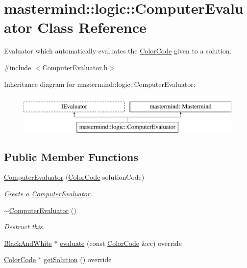 \hypertarget{classmastermind_1_1logic_1_1_computer_evaluator}{}\section{mastermind\+:\+:logic\+:\+:Computer\+Evaluator Class Reference}
\label{classmastermind_1_1logic_1_1_computer_evaluator}


Evaluator which automatically evaluates the \hyperlink{classmastermind_1_1logic_1_1_color_code}{Color\+Code} given to a solution.  




{\ttfamily \#include $<$Computer\+Evaluator.\+h$>$}

Inheritance diagram for mastermind\+:\+:logic\+:\+:Computer\+Evaluator\+:\begin{figure}[H]
\begin{center}
\leavevmode
\includegraphics[height=2.000000cm]{classmastermind_1_1logic_1_1_computer_evaluator}
\end{center}
\end{figure}
\subsection*{Public Member Functions}
\begin{DoxyCompactItemize}
\item 
\hyperlink{classmastermind_1_1logic_1_1_computer_evaluator_a63c369068472dc8117552f991bd37a7a}{Computer\+Evaluator} (\hyperlink{classmastermind_1_1logic_1_1_color_code}{Color\+Code} solution\+Code)
\begin{DoxyCompactList}\small\item\em Create a \hyperlink{classmastermind_1_1logic_1_1_computer_evaluator}{Computer\+Evaluator}. \end{DoxyCompactList}\item 
\hyperlink{classmastermind_1_1logic_1_1_computer_evaluator_aa216efb1cb2e885562d01b76751c84be}{$\sim$\+Computer\+Evaluator} ()
\begin{DoxyCompactList}\small\item\em Destruct this. \end{DoxyCompactList}\item 
\hyperlink{classmastermind_1_1logic_1_1_black_and_white}{Black\+And\+White} $\ast$ \hyperlink{classmastermind_1_1logic_1_1_computer_evaluator_a579f808c46ab11077c4a3ce51838714b}{evaluate} (const \hyperlink{classmastermind_1_1logic_1_1_color_code}{Color\+Code} \&cc) override
\item 
\hyperlink{classmastermind_1_1logic_1_1_color_code}{Color\+Code} $\ast$ \hyperlink{classmastermind_1_1logic_1_1_computer_evaluator_ac6e0423a5ef2f6679cfe6be75d3a09dd}{get\+Solution} () override
\end{DoxyCompactItemize}
